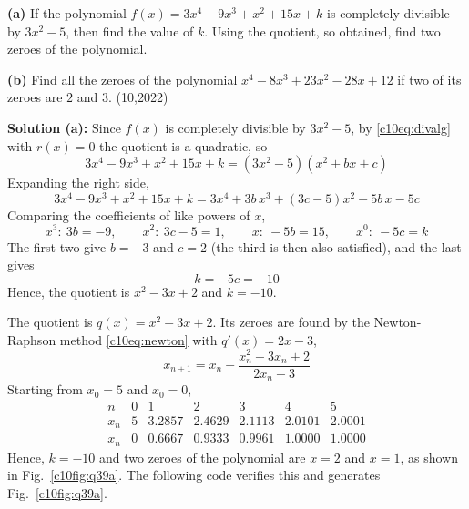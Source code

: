\clearpage
\item \textbf{(a)} If the polynomial $f(x) = 3x^4 - 9x^3 + x^2 + 15x + k$ is completely divisible by $3x^2 - 5$, then find the value of $k$. Using the quotient, so obtained, find two zeroes of the polynomial.

\textbf{(b)} Find all the zeroes of the polynomial $x^4 - 8x^3 + 23x^2 - 28x + 12$ if two of its zeroes are $2$ and $3$. \hfill (10,2022)

\textbf{Solution (a):} Since $f(x)$ is completely divisible by $3x^2 - 5$, by \eqref{c10eq:divalg} with $r(x) = 0$ the quotient is a quadratic, so
\begin{equation}
3x^4 - 9x^3 + x^2 + 15x + k = \left(3x^2 - 5\right)\left(x^2 + bx + c\right)
\end{equation}
Expanding the right side,
\begin{equation}
3x^4 - 9x^3 + x^2 + 15x + k = 3x^4 + 3b\,x^3 + \left(3c - 5\right)x^2 - 5b\,x - 5c
\end{equation}
Comparing the coefficients of like powers of $x$,
\begin{equation}
x^3: \ 3b = -9, \qquad x^2: \ 3c - 5 = 1, \qquad x: \ -5b = 15, \qquad x^0: \ -5c = k
\end{equation}
The first two give $b = -3$ and $c = 2$ (the third is then also satisfied), and the last gives
\begin{equation}
k = -5c = -10
\end{equation}
Hence, the quotient is $x^2 - 3x + 2$ and $k = -10$.

The quotient is $q(x) = x^2 - 3x + 2$. Its zeroes are found by the Newton-Raphson method \eqref{c10eq:newton} with $q'(x) = 2x - 3$,
\begin{equation}
x_{n+1} = x_n - \frac{x_n^2 - 3x_n + 2}{2x_n - 3}
\end{equation}
Starting from $x_0 = 5$ and $x_0 = 0$,
\begin{equation}
\begin{array}{c|cccccc}
n & 0 & 1 & 2 & 3 & 4 & 5 \\ \hline
x_n & 5 & 3.2857 & 2.4629 & 2.1113 & 2.0101 & 2.0001 \\
x_n & 0 & 0.6667 & 0.9333 & 0.9961 & 1.0000 & 1.0000
\end{array}
\end{equation}
Hence, $k = -10$ and two zeroes of the polynomial are $x = 2$ and $x = 1$, as shown in Fig.~\ref{c10fig:q39a}. The following code verifies this and generates Fig.~\ref{c10fig:q39a}.

